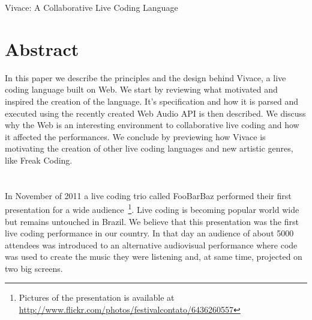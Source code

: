 \documentclass[letterpaper, 12pt]{article}
\begin{document}

\vspace*{24pt}


 {\cmjTitle Vivace: A Collaborative Live Coding Language}


\section*{Abstract}

In this paper we describe the principles and the design behind Vivace,
a live coding language built on Web. We start by reviewing what
motivated and inspired the creation of the language. It's
specification and how it is parsed and executed using the recently
created Web Audio API is then described. We discuss why the Web is an
interesting environment to collaborative live coding and how it
affected the performances. We conclude by previewing how Vivace is
motivating the creation of other live coding languages and new
artistic genres, like Freak Coding.

\section*{} %

In November of 2011 a live coding trio called FooBarBaz performed
their first presentation for a wide audience~\footnote{Pictures of the
  presentation is available at
  \url{http://www.flickr.com/photos/festivalcontato/6436260557}}. Live
coding is becoming popular world wide but remains untouched in
Brazil. We believe that this presentation was the first live coding
performance in our country. In that day an audience of about 5000
attendees was introduced to an alternative audiovisual performance
where code was used to create the music they were listening and, at
same time, projected on two big screens.  
\end{document}
